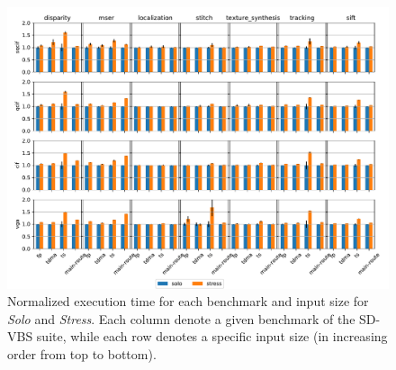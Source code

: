 \begin{figure}
    \centering
    \includegraphics[scale=0.54]{images/Execution_times.pdf}
    \caption{Normalized execution time for each benchmark and input size for \emph{Solo} and \emph{Stress}. Each column denote a given benchmark of the SD-VBS suite, while each row denotes a specific input size (in increasing order from top to bottom).}
    \label{fig:isolation_ratio}
\end{figure}
